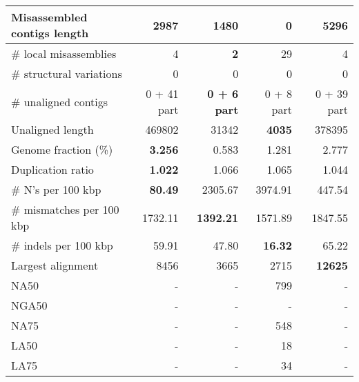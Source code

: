 \documentclass[12pt,a4paper]{article}
\begin{document}
\begin{table}[ht]
\begin{center}
\begin{tabular}{|l*{4}{|r}|}
Misassembled contigs length & 2987 & 1480 & {\bf 0} & 5296 \\ \hline
\# local misassemblies & 4 & {\bf 2} & 29 & 4 \\ \hline
\# structural variations & 0 & 0 & 0 & 0 \\ \hline
\# unaligned contigs & 0 + 41 part & {\bf 0 + 6 part} & 0 + 8 part & 0 + 39 part \\ \hline
Unaligned length & 469802 & 31342 & {\bf 4035} & 378395 \\ \hline
Genome fraction (\%) & {\bf 3.256} & 0.583 & 1.281 & 2.777 \\ \hline
Duplication ratio & {\bf 1.022} & 1.066 & 1.065 & 1.044 \\ \hline
\# N's per 100 kbp & {\bf 80.49} & 2305.67 & 3974.91 & 447.54 \\ \hline
\# mismatches per 100 kbp & 1732.11 & {\bf 1392.21} & 1571.89 & 1847.55 \\ \hline
\# indels per 100 kbp & 59.91 & 47.80 & {\bf 16.32} & 65.22 \\ \hline
Largest alignment & 8456 & 3665 & 2715 & {\bf 12625} \\ \hline
NA50 & - & - & 799 & - \\ \hline
NGA50 & - & - & - & - \\ \hline
NA75 & - & - & 548 & - \\ \hline
LA50 & - & - & 18 & - \\ \hline
LA75 & - & - & 34 & - \\ \hline
\end{tabular}
\end{center}
\end{table}
\end{document}
